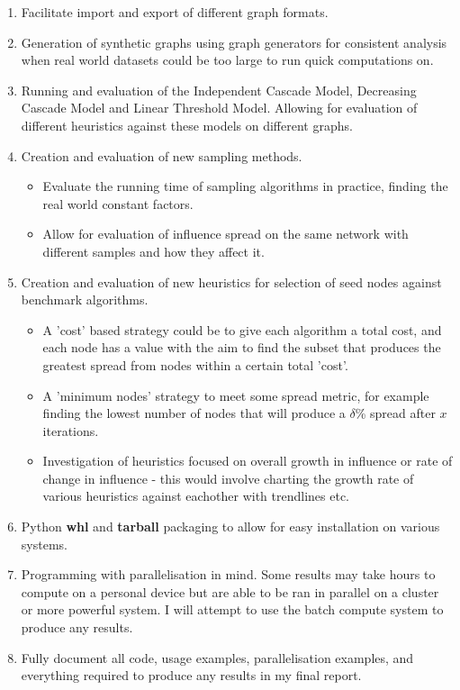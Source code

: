 \documentclass{article}
\begin{document}
\begin{enumerate}
	\item Facilitate import and export of different graph formats.
	\item Generation of synthetic graphs using graph generators for consistent analysis when real world datasets could be too large to run quick computations on.
	\item Running and evaluation of the Independent Cascade Model, Decreasing Cascade Model and  Linear Threshold Model.
	      Allowing for evaluation of different heuristics against these models on different graphs.
	\item Creation and evaluation of new sampling methods.
	      \begin{itemize}
		      \item Evaluate the running time of sampling algorithms in practice, finding the real world constant factors.
		      \item Allow for evaluation of influence spread on the same network with different samples and how they affect it.
	      \end{itemize}
	\item Creation and evaluation of new heuristics for selection of seed nodes against benchmark algorithms.
	      \begin{itemize}
		      \item A 'cost' based strategy could be to give each algorithm a total cost, and each node has a value with the aim to find the subset that produces the greatest spread from nodes within a certain total 'cost'.
		      \item	A 'minimum nodes' strategy to meet some spread metric, for example finding the lowest number of nodes that will produce a $\delta$\% spread after $x$ iterations.
		      \item Investigation of heuristics focused on overall growth in influence or rate of change in influence - this would involve charting the growth rate of various heuristics against eachother with trendlines etc.
	      \end{itemize}
	\item Python \textbf{whl} and \textbf{tarball} packaging to allow for easy installation on various systems.
	\item Programming with parallelisation in mind.
	      Some results may take hours to compute on a personal device but are able to be ran in parallel on a cluster or more powerful system.
	      I will attempt to use the batch compute system to produce any results.
	\item Fully document all code, usage examples, parallelisation examples, and everything required to produce any results in my final report.
\end{enumerate}
\end{document}
